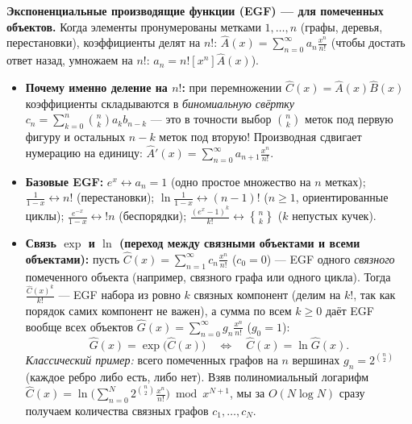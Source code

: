 \documentclass[10pt,a4paper]{article}
\renewcommand{\ge}{\geqslant}
\newcommand{\stirlingsecond}[2]{\genfrac{\{}{\}}{0pt}{}{#1}{#2}}
\begin{document}
\textbf{Экспоненциальные производящие функции (EGF) — для помеченных объектов.} Когда элементы пронумерованы метками $1, \dots, n$ (графы, деревья, перестановки), коэффициенты делят на $n!$: $\widehat{A}(x) = \sum_{n=0}^\infty a_n \frac{x^n}{n!}$ (чтобы достать ответ назад, умножаем на $n!$: $a_n = n! [x^n]\widehat{A}(x)$).
\begin{itemize}
  \item \textbf{Почему именно деление на $n!$:} при перемножении $\widehat{C}(x) = \widehat{A}(x)\widehat{B}(x)$ коэффициенты складываются в \emph{биномиальную свёртку} $c_n = \sum_{k=0}^n \binom{n}{k} a_k b_{n - k}$ — это в точности выбор $\binom{n}{k}$ меток под первую фигуру и остальных $n - k$ меток под вторую! Производная сдвигает нумерацию на единицу: $\widehat{A}'(x) = \sum_{n=0}^\infty a_{n + 1} \frac{x^n}{n!}$.
  \item \textbf{Базовые EGF:} $e^x \leftrightarrow a_n = 1$ (одно простое множество на $n$ метках); $\frac{1}{1 - x} \leftrightarrow n!$ (перестановки); $\ln\frac{1}{1 - x} \leftrightarrow (n - 1)!$ ($n \ge 1$, ориентированные циклы); $\frac{e^{-x}}{1 - x} \leftrightarrow !n$ (беспорядки); $\frac{(e^x - 1)^k}{k!} \leftrightarrow \stirlingsecond{n}{k}$ ($k$ непустых кучек).
  \item \textbf{Связь $\exp$ и $\ln$ (переход между связными объектами и всеми объектами):} пусть $\widehat{C}(x) = \sum_{n=1}^\infty c_n \frac{x^n}{n!}$ ($c_0 = 0$) — EGF одного \emph{связного} помеченного объекта (например, связного графа или одного цикла). Тогда $\frac{\widehat{C}(x)^k}{k!}$ — EGF набора из ровно $k$ связных компонент (делим на $k!$, так как порядок самих компонент не важен), а сумма по всем $k \ge 0$ даёт EGF вообще всех объектов $\widehat{G}(x) = \sum_{n=0}^\infty g_n \frac{x^n}{n!}$ ($g_0 = 1$):
  \[
    \widehat{G}(x) = \exp\!\bigl(\widehat{C}(x)\bigr) \quad \Longleftrightarrow \quad \widehat{C}(x) = \ln \widehat{G}(x).
  \]
  \emph{Классический пример:} всего помеченных графов на $n$ вершинах $g_n = 2^{\binom{n}{2}}$ (каждое ребро либо есть, либо нет). Взяв полиномиальный логарифм $\widehat{C}(x) = \ln\!\bigl(\sum_{n=0}^N 2^{\binom{n}{2}} \frac{x^n}{n!}\bigr) \bmod x^{N + 1}$, мы за $O(N \log N)$ сразу получаем количества связных графов $c_1, \dots, c_N$.
\end{itemize}
\end{document}
